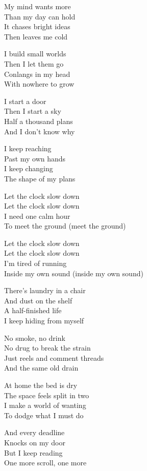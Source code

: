 \begin{lyrics}
My mind wants more\\
Than my day can hold\\
It chases bright ideas\\
Then leaves me cold

I build small worlds\\
Then I let them go\\
Conlangs in my head\\
With nowhere to grow

I start a door\\
Then I start a sky\\
Half a thousand plans\\
And I don’t know why

I keep reaching\\
Past my own hands\\
I keep changing\\
The shape of my plans

Let the clock slow down\\
Let the clock slow down\\
I need one calm hour\\
To meet the ground (meet the ground)

Let the clock slow down\\
Let the clock slow down\\
I’m tired of running\\
Inside my own sound (inside my own sound)

There’s laundry in a chair\\
And dust on the shelf\\
A half-finished life\\
I keep hiding from myself

No smoke, no drink\\
No drug to break the strain\\
Just reels and comment threads\\
And the same old drain

At home the bed is dry\\
The space feels split in two\\
I make a world of wanting\\
To dodge what I must do

And every deadline\\
Knocks on my door\\
But I keep reading\\
One more scroll, one more


\end{lyrics}
